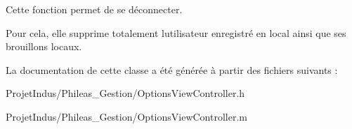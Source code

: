 Cette fonction permet de se déconnecter. 

Pour cela, elle supprime totalement l\textquotesingle{}utilisateur enregistré en local ainsi que ses brouillons locaux. 

La documentation de cette classe a été générée à partir des fichiers suivants \+:\begin{DoxyCompactItemize}
\item 
Projet\+Indus/\+Phileas\+\_\+\+Gestion/Options\+View\+Controller.\+h\item 
Projet\+Indus/\+Phileas\+\_\+\+Gestion/Options\+View\+Controller.\+m\end{DoxyCompactItemize}

